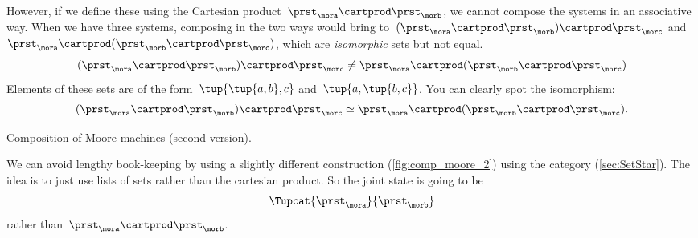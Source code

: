 However, if we define these using the Cartesian product~$\prst_{\mora} \cartprod \prst_{\morb}$, we cannot compose the systems in an associative way.
When we have three systems, composing in the two ways would bring to~$(\prst_{\mora} \cartprod \prst_{\morb}) \cartprod \prst_{\morc}$ and~$\prst_{\mora} \cartprod (\prst_{\morb} \cartprod \prst_{\morc})$, which are \emph{isomorphic} sets but not equal.
%
\begin{equation}
    \label{eq:assoc-fails1}
    (\prst_{\mora} \cartprod \prst_{\morb}) \cartprod \prst_{\morc} \neq \prst_{\mora} \cartprod (\prst_{\morb} \cartprod \prst_{\morc})
\end{equation}
Elements of these sets are of the form~$\tup{\tup{a,b},c}$ and~$\tup{a, \tup{b,c}}$.
%
You can clearly spot the isomorphism:
%
\begin{equation}
    \label{eq:assoc-fails2}
    (\prst_{\mora} \cartprod \prst_{\morb}) \cartprod \prst_{\morc} \simeq \prst_{\mora} \cartprod (\prst_{\morb} \cartprod \prst_{\morc}).
\end{equation}
%

\begin{marginfigure}
    \centering
    \caption{Composition of Moore machines (second version).}
    \label{fig:comp_moore_2}
\end{marginfigure}

We can avoid lengthy book-keeping by using a slightly different construction (\cref{fig:comp_moore_2}) using the \SetStar category (\cref{sec:SetStar}).
%
The idea is to just use lists of sets rather than the cartesian product.
So the joint state is going to be
\begin{equation}
    \label{eq:moore-comp-good-joint}
    \Tupcat {\prst_{\mora}}   {\prst_{\morb}}
\end{equation}
rather than~$\prst_{\mora} \cartprod \prst_{\morb}$.

